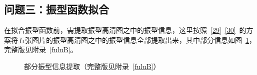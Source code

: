 \documentclass[withoutpreface,bwprint]{cumcmthesis} %
\begin{document}
\subsection{问题三：振型函数拟合}
在拟合振型函数前，需提取振型高清图之中的振型信息，这里按照~\eqref{29}~\eqref{30}~的方案将五张图片的振型高清图之中的振型信息全部提取出来，其中部分信息如图~\ref{fig10}，完整版见附录~\ref{fuluB}。
\begin{figure}[htbp]
\centering
{}
\hfil
{}
\hfil
\caption{部分振型信息提取（完整版见附录~\ref{fuluB}）}
\label{fig_4.3.1}
\vspace{-0.4cm}
\label{fig10}
\end{figure}
\end{document}
